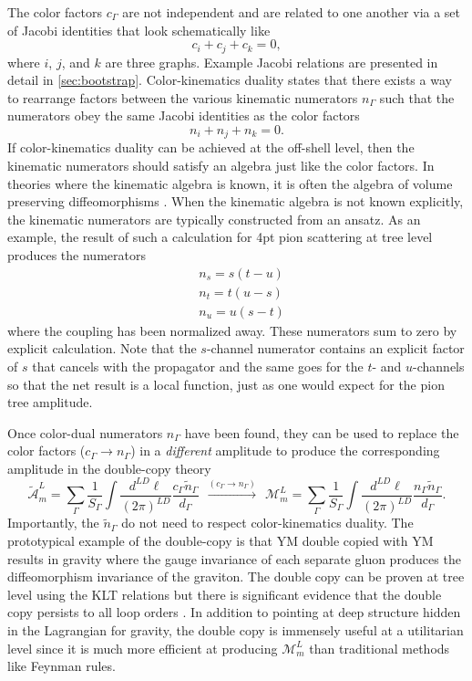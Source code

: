 \documentclass[11pt,letter]{article}
\def\be{\begin{equation}}
\begin{document}
The color factors $c_\Gamma$ are not independent and are related to
one another via a set of Jacobi identities that look schematically
like
\begin{equation}
c_i+c_j+c_k=0,
\end{equation}
where $i$, $j$, and $k$ are three graphs.  Example Jacobi relations
are presented in detail in \cref{sec:bootstrap}.  Color-kinematics
duality states that there exists a way to rearrange factors between
the various kinematic numerators $n_\Gamma$ such that the numerators
obey the same Jacobi identities as the color factors
\begin{equation}
n_i +n_j +n_k=0.
\end{equation}
If color-kinematics duality can be achieved at the off-shell level,
then the kinematic numerators should satisfy an algebra just like the
color factors.  In theories where the kinematic algebra is known, it
is often the algebra of volume preserving diffeomorphisms
\cite{Monteiro2011pc, Ben-Shahar:2021zww, Cheung:2020djz,
  Cheung:2021zvb, Cheung:2022mix}.
When the kinematic algebra is not known explicitly, the kinematic numerators are typically constructed from an ansatz.
As an example, the result of such a calculation for 4pt pion scattering at tree level produces the numerators
\begin{align}
&n_s = s(t-u)\\
&n_t = t(u-s)\\
&n_u = u(s-t)
\end{align}
where the coupling has been normalized away.  These numerators sum to
zero by explicit calculation.  Note that the $s$-channel numerator
contains an explicit factor of $s$ that cancels with the propagator
and the same goes for the $t$- and $u$-channels so that the net result
is a local function, just as one would expect for the pion tree
amplitude.

Once color-dual numerators $n_\Gamma$ have been found, they can be
used to replace the color factors ($c_\Gamma \to n_\Gamma$) in a
\emph{different} amplitude to produce the corresponding amplitude in
the double-copy theory \be\label{DCconstruction}
\tilde{\mathcal{A}}_m^L = \sum \limits_\Gamma \frac{1}{S_\Gamma} \int
\frac{d^{LD}\ell}{(2\pi)^{LD}} \frac{c_\Gamma
  \tilde{n}_\Gamma}{d_\Gamma} ~~ \xrightarrow{(c_\Gamma \to n_\Gamma)}
~~ \mathcal{M}_m^L = \sum \limits_\Gamma \frac{1}{S_\Gamma} \int
\frac{d^{LD}\ell}{(2\pi)^{LD}} \frac{n_\Gamma
  \tilde{n}_\Gamma}{d_\Gamma}.
\end{equation}
Importantly, the $\tilde{n}_\Gamma$ do not need to respect
color-kinematics duality.  The prototypical example of the double-copy
is that YM double copied with YM results in gravity where the gauge
invariance of each separate gluon produces the diffeomorphism
invariance of the graviton.  The double copy can be proven at tree
level using the KLT relations but there is significant evidence that
the double copy persists to all loop orders \cite{FiveLoopN4, GeneralizedDoubleCopyFiveLoops, Bern:2018jmv, Carrasco:2021otn, KLT, KiermaierTalk}.
In addition to pointing at deep
structure hidden in the Lagrangian for gravity, the double copy is
immensely useful at a utilitarian level since it is much more
efficient at producing $\mathcal{M}_m^L$ than traditional methods like
Feynman rules.
\end{document}
